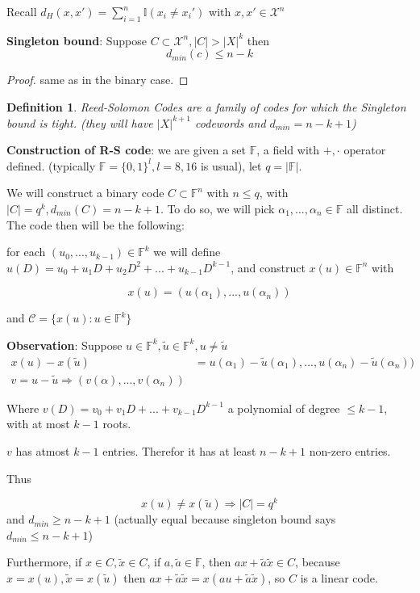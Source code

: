 \documentclass[twoside]{article}
\newtheorem{definition}{Definition}[section]
\theoremstyle{definition} %
\def\X{\mathcal{X}}
\def\F{\mathbb{F}}
\def\I{\mathbb{I}}
\def\C{\mathcal{C}}
\begin{document}
Recall $d_H(x, x') = \sum_{i = 1}^n \I(x_i \neq x_i')$ with $x, x'\in \X^n$

\textbf{Singleton bound}: Suppose $C \subset \X^n, |C| > |X|^k$ then
\[
  d_{min}(c) \leq n - k
\]

\begin{proof}
  same as in the binary case.
\end{proof}

\begin{definition}{Reed-Solomon Codes}
  are a family of codes for which the Singleton bound is tight. (they will have $|X|^{k+1}$ codewords and $d_{min} = n - k + 1$)
\end{definition}

\textbf{Construction of R-S code}: we are given a set $\F$, a field with $+, \cdot$ operator defined. (typically $\F = \{ 0, 1 \}^l, l = 8, 16$ is usual), let $q = |\F|$.

We will construct a binary code $C \subset \F^n$ with $n \leq q$, with $|C| = q^k, d_{min}(C) = n - k + 1$. To do so, we will pick $\alpha_1, ... , \alpha_n \in \F$ all distinct. The code then will be the following:

for each $(u_0, ..., u_{k-1}) \in \F^k$ we will define $u(D) = u_0 + u_1 D + u_2 D^2 + ... + u_{k-1} D^{k-1}$, and construct $x(u) \in \F^n$ with

\[
  x(u) = (u(\alpha_1), ..., u(\alpha_n))
\]

and $ \C = \{ x(u): u \in \F^k \}$

\textbf{Observation}: Suppose $u \in \F^k, \tilde{u} \in \F^k, u \neq \tilde{u}$
\begin{align*}
  x(u) - x(\tilde{u}) &= u(\alpha_1) - \tilde{u}(\alpha_1), ..., u(\alpha_n) - \tilde{u}(\alpha_n)) \\
  v = u - \tilde{u} \Rightarrow (v(\alpha), ..., v(\alpha_n))
\end{align*}

Where $v(D) = v_0 + v_1 D + ... + v_{k-1} D^{k-1}$ a polynomial of degree $\leq k-1$, with at most $k-1$ roots.

$v$ has atmost $k-1$ entries. Therefor it has at least $n - k + 1$ non-zero entries.

Thus

\[
  x(u) \neq x(\tilde u) \Rightarrow |C| = q^k
\]
and $d_{min} \geq n - k + 1$ (actually equal because singleton bound says $d_{min} \leq n - k + 1$)

Furthermore, if $x \in C, \tilde{x} \in C$, if $a, \tilde{a} \in \F$, then $ax + \tilde{a} \tilde{x} \in C$, because $x = x(u), \tilde{x} = x(\tilde{u})$ then $ax + \tilde{a} \tilde{x} = x(a u +  \tilde{a} \tilde{x})$, so $C$ is a linear code.
\end{document}
